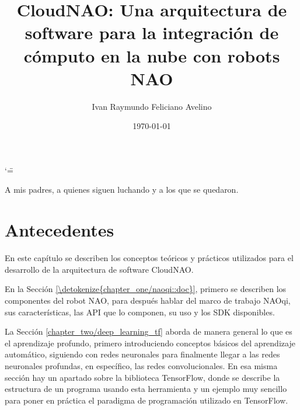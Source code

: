 \documentclass[letterpaper,12pt,spanish]{report}
\title{CloudNAO: Una arquitectura de software para la integración de
cómputo en la nube con robots NAO}
\date{\today}
\author{Ivan Raymundo Feliciano Avelino}
\newenvironment{dedication}
  {\clearpage           %
   \thispagestyle{empty}%
   \vspace*{\stretch{1}}%
   \itshape             %
   \raggedleft          %
  }
  {\par %
   \vspace{\stretch{3}} %
   \clearpage           %
  }
\begin{document}
\ifnum\catcode`\"=\active{}\fi


\begin{dedication}
    \vspace{\baselineskip}
    A mis padres, a quienes siguen luchando y a los que se quedaron. 
  \end{dedication}

\sphinxtableofcontents








\chapter{Antecedentes}
\label{\detokenize{chapter_one:antecedentes}}\label{\detokenize{chapter_one::doc}}

En este capítulo se describen los conceptos 
teóricos y prácticos utilizados para el desarrollo
de la arquitectura de software CloudNAO.

En la Sección \ref{\detokenize{chapter_one/naoqi::doc}}, primero se describen los componentes del robot  
NAO, para después hablar del marco de trabajo NAOqi, sus características, las API que lo componen, su uso y los SDK disponibles. 

La Sección \ref{chapter_two/deep_learning_tf} 
aborda de manera general lo que es el aprendizaje 
profundo, primero introduciendo conceptos básicos del 
aprendizaje automático, siguiendo con redes neuronales 
para finalmente llegar a las redes neuronales profundas, 
en específico, las redes convolucionales. En esa misma 
sección hay un apartado sobre la biblioteca TensorFlow,
donde se describe la estructura de un programa
usando esta herramienta y un ejemplo muy
sencillo para poner en práctica el paradigma de programación utilizado
en TensorFlow.
\end{document}
